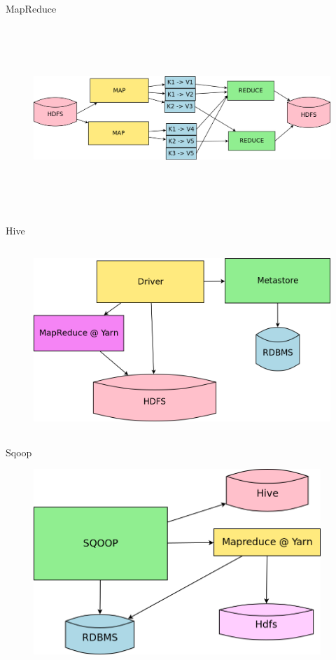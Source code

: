 \documentclass{beamer}
\begin{document}
\begin{frame}{MapReduce}
	\begin{figure}
		\includegraphics[width=\textwidth,height=7cm,keepaspectratio=true]{mapreduce}
	\end{figure}
\end{frame}
\begin{frame}{Hive}
	\begin{figure}
		\includegraphics[width=\textwidth,height=7cm,keepaspectratio=true]{hive}
	\end{figure}
\end{frame}
\begin{frame}{Sqoop}
	\begin{figure}
		\includegraphics[width=\textwidth,height=7cm,keepaspectratio=true]{sqoop}
	\end{figure}
\end{frame}
\end{document}
